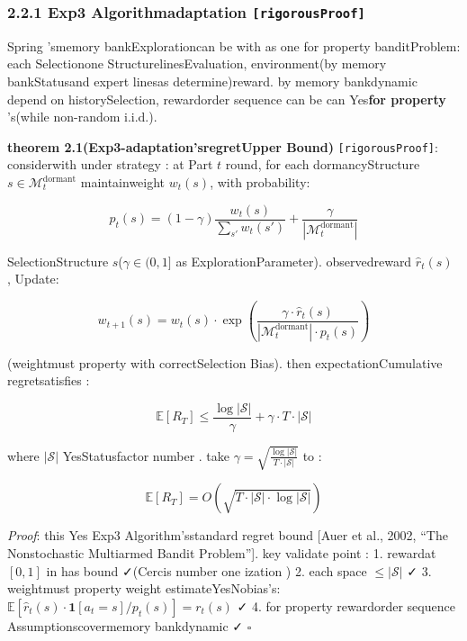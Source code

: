 \documentclass[
  12pt,
]{article}
\begin{document}
\subsubsection{\texorpdfstring{2.2.1 Exp3 Algorithmadaptation
\texttt{{[}rigorousProof{]}}}{2.2.1 Exp3 Algorithmadaptation {[}rigorousProof{]}}}\label{exp3-ux7b97ux6cd5ux9002ux914d-ux4e25ux683cux8bc1ux660e}

Spring
'smemory bankExplorationcan be with as one for property banditProblem: each Selectionone StructurelinesEvaluation, environment(by memory bankStatusand expert linesas determine)reward. by memory bankdynamic depend on historySelection, rewardorder sequence can be can Yes\textbf{for property }'s(while non-random
i.i.d.). 

\textbf{theorem  2.1(Exp3-adaptation'sregretUpper Bound)}
\texttt{{[}rigorousProof{]}}: considerwith under strategy : at Part \(t\) round, for each dormancyStructure
\(s \in \mathcal{M}_t^{\text{dormant}}\) maintainweight \(w_t(s)\), with probability: 

\[p_t(s) = (1 - \gamma) \frac{w_t(s)}{\sum_{s'} w_t(s')} + \frac{\gamma}{|\mathcal{M}_t^{\text{dormant}}|}\]

SelectionStructure \(s\)(\(\gamma \in (0, 1]\) as ExplorationParameter). observedreward
\(\hat{r}_t(s)\) , Update: 

\[w_{t+1}(s) = w_t(s) \cdot \exp\left(\frac{\gamma \cdot \hat{r}_t(s)}{|\mathcal{M}_t^{\text{dormant}}| \cdot p_t(s)}\right)\]

(weightmust property with correctSelection Bias). then expectationCumulative regretsatisfies : 

\[\boxed{\mathbb{E}[R_T] \leq \frac{\log |\mathcal{S}|}{\gamma} + \gamma \cdot T \cdot |\mathcal{S}|}\]

where \(|\mathcal{S}|\) YesStatusfactor number . take
\(\gamma = \sqrt{\frac{\log |\mathcal{S}|}{T \cdot |\mathcal{S}|}}\)
to : 

\[\boxed{\mathbb{E}[R_T] = O\left(\sqrt{T \cdot |\mathcal{S}| \cdot \log |\mathcal{S}|}\right)}\]

\emph{Proof}: this Yes Exp3 Algorithm'sstandard regret bound {[}Auer et al., 2002, ``The
Nonstochastic Multiarmed Bandit Problem''{]}. key validate point :  1. rewardat 
\([0, 1]\) in has bound  ✓(Cercis number one ization ) 2. each space 
\(\leq |\mathcal{S}|\) ✓ 3.
weightmust property weight estimateYesNobias's: \(\mathbb{E}[\hat{r}_t(s) \cdot \mathbf{1}[a_t = s] / p_t(s)] = r_t(s)\)
✓ 4. for property rewardorder sequence Assumptionscovermemory bankdynamic  ✓ \(\square\)
\end{document}
